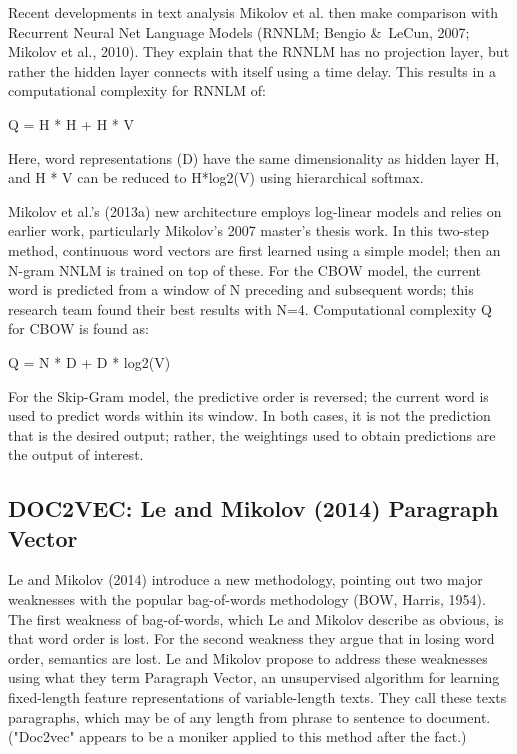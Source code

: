 \documentclass[11pt]{article}
\begin{document}
\begin{section}{Recent developments in text analysis }
Mikolov et al. then make comparison with Recurrent Neural Net Language Models (RNNLM; Bengio \&\  LeCun, 2007; Mikolov et al., 2010). They explain that the RNNLM has no projection layer, but rather the hidden layer connects with itself using a time delay. This results in a computational complexity for RNNLM of:

\begin{center}
Q = H * H + H * V
\end{center}
Here, word representations (D) have the same dimensionality as hidden layer H, and H * V can be reduced to H*log2(V) using hierarchical softmax.

Mikolov et al.'s (2013a) new architecture employs log-linear models and relies on earlier work, particularly Mikolov's 2007 master's thesis work. In this two-step method, continuous word vectors are first learned using a simple model; then an N-gram NNLM is trained on top of these. For the CBOW model, the current word is predicted from a window of N preceding and subsequent words; this research team found their best results with N=4. Computational complexity Q for CBOW is found as:
\begin{center}

Q = N * D + D * log2(V)

\end{center}

For the Skip-Gram model, the predictive order is reversed; the current word is used to predict words within its window. In both cases, it is not the prediction that is the desired output; rather, the weightings used to obtain predictions are the output of interest.

\subsection{DOC2VEC: Le and Mikolov (2014) Paragraph Vector}

Le and Mikolov (2014) introduce a new methodology, pointing out two major weaknesses with the popular bag-of-words methodology (BOW, Harris, 1954). The first weakness of bag-of-words, which Le and Mikolov describe as obvious, is that word order is lost. For the second weakness they argue that in losing word order, semantics are lost. Le and Mikolov propose to address these weaknesses using what they term Paragraph Vector, an unsupervised algorithm for learning fixed-length feature representations of variable-length texts. They call these texts paragraphs, which may be of any length from phrase to sentence to document. ("Doc2vec" appears to be a moniker applied to this method after the fact.)


\end{section}
\end{document}
